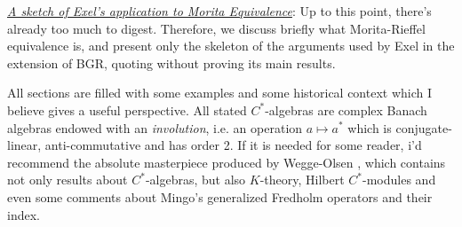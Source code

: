 \begin{itroman}
	\item \underline{\textit{A sketch of Exel's application to Morita Equivalence}}: Up to this point, there's already too much to digest. Therefore, we discuss briefly what Morita-Rieffel equivalence is, and present only the skeleton of the arguments used by Exel in the extension of BGR, quoting without proving its main results.      
\end{itroman}

All sections are filled with some examples and some historical context which I believe gives a useful perspective. All stated $C^*$-algebras are complex Banach algebras endowed with an \textit{involution}, i.e. an operation $a \longmapsto a^*$ which is  conjugate-linear, anti-commutative and has order 2. If it is needed for some reader, i'd recommend the absolute masterpiece produced by Wegge-Olsen \cite{wegge1993k}, which contains not only results about $C^*$-algebras, but also $K$-theory, Hilbert $C^*$-modules and even some comments about Mingo's generalized Fredholm operators and their index. 
